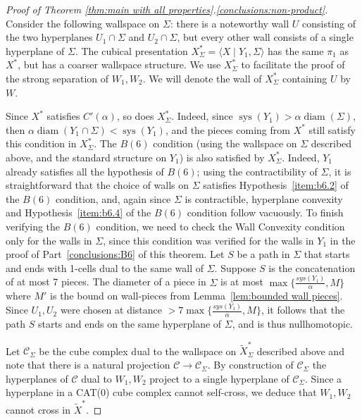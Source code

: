 \documentclass[12pt,oneside]{amsart}
\theoremstyle{definition}
\theoremstyle{definition}
\theoremstyle{remark}
\DeclareMathOperator{\diam}{\text{diam}}
\DeclareMathOperator{\sys}{\mathrm sys}
\begin{document}
\begin{proof}[Proof of Theorem \ref{thm:main with all properties}.\eqref{conclusions:non-product}]
Consider the following wallspace on $\Sigma$: there is a noteworthy wall $U$ consisting of the two hyperplanes $U_1\cap \Sigma$ and $U_2\cap \Sigma$, but every other wall consists of a single hyperplane of $\Sigma$.
The cubical presentation
$X^*_{\Sigma}=\langle X \mid Y_1, \Sigma\rangle$ has the same $\pi_1$ as $X^*$, but has a coarser wallspace structure. We use  $X^*_{\Sigma}$ to facilitate  the proof of the strong separation of $W_1,W_2$. We will denote the wall of $X^*_{\Sigma}$ containing $U$ by $W$.

Since $X^*$  satisfies $C'(\alpha)$, so does $X^*_{\Sigma}$. Indeed, since $\sys(Y_1)> \alpha \diam(\Sigma)$, then $\alpha \diam(Y_1\cap \Sigma)< \sys(Y_1)$, and the pieces coming from $X^*$ still satisfy this condition in $X^*_{\Sigma}$. 
The $B(6)$ condition (using the  wallspace on $\Sigma$ described above, and the standard structure on $Y_1$) is also satisfied by $X^*_{\Sigma}$. Indeed, $Y_1$ already satisfies all the hypothesis of  $B(6)$; using the contractibility of $\Sigma$,  it is straightforward that the choice of walls on $\Sigma$ satisfies Hypothesis~\eqref{item:b6.2} of the $B(6)$ condition, and, again since $\Sigma$ is contractible, hyperplane convexity and Hypothesis~\eqref{item:b6.4} of the $B(6)$ condition follow vacuously. To finish verifying the $B(6)$ condition, we need to check the Wall Convexity condition only for the walls in $\Sigma$, since this condition was verified for the walls in $Y_1$ in the proof of 
Part~\eqref{conclusions:B6} of this theorem.
Let $S$ be a path in $\Sigma$ that starts and ends with 1-cells
dual to the same wall of $\Sigma$. Suppose $S$ is the concatenation of at most 7 pieces. The diameter of a piece in $\Sigma$ is at most $\max\{\frac{sys(Y_1)}{\alpha},M\}$ where $M'$ is the bound on wall-pieces from Lemma~\ref{lem:bounded wall pieces}. Since $U_1, U_2$ were chosen at distance $>7\max\{\frac{sys(Y_1)}{\alpha},M\}$,  it follows that the path $S$ starts and ends on the same hyperplane of $\Sigma$, and is thus nullhomotopic.
   
Let $\mathcal{C}_\Sigma$ be the cube complex dual to the wallspace on $\widetilde X^*_{\Sigma}$ described above and note that there is a natural projection $\mathcal{C} \to\mathcal{C}_\Sigma$.
By construction of $\mathcal{C}_\Sigma$ the hyperplanes of $\mathcal{C}$ dual to $W_1, W_2$ project to a single hyperplane  of $\mathcal{C}_\Sigma$. Since a hyperplane in a CAT(0) cube complex cannot self-cross, we deduce that $W_1,W_2$ cannot cross in $\widetilde X^*$.


\end{proof}
\end{document}
